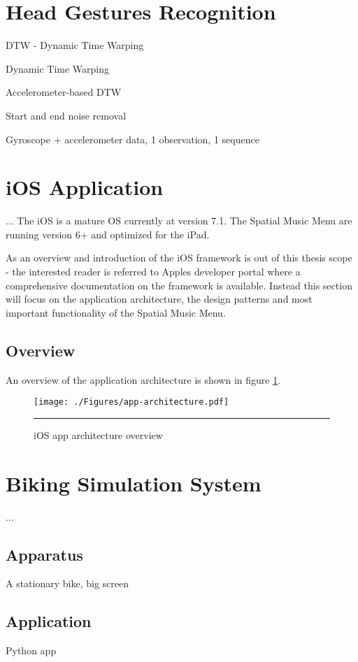 \section{Head Gestures Recognition}

DTW - Dynamic Time Warping 

Dynamic Time Warping \cite{salvador_toward_2007}

Accelerometer-based DTW \cite{akl_accelerometer-based_2010}

Start and end noise removal

Gyroscope + accelerometer data, 1 observation, 1 sequence


\section{iOS Application}
...
The iOS is a mature OS currently at version 7.1. The Spatial Music Menu are running version 6+ and optimized for the iPad.

As an overview and introduction of the iOS framework is out of this thesis scope - the interested reader is referred to Apples developer portal \cite{apple_apple_2014} where a comprehensive documentation on the framework is available. Instead this section will focus on the application architecture, the design patterns and most important functionality of the Spatial Music Menu.

\subsection{Overview}
An overview of the application architecture is shown in figure \ref{fig:apparchitecture}.

\begin{figure}[htbp]
	\centering
		\texttt{[image: ./Figures/app-architecture.pdf]}
		\rule{35em}{1pt}
	\caption[App architecture]{iOS app architecture overview}
	\label{fig:apparchitecture}
\end{figure}


\section{Biking Simulation System}
...

\subsection{Apparatus}
A stationary bike, big screen

\subsection{Application}

Python app





